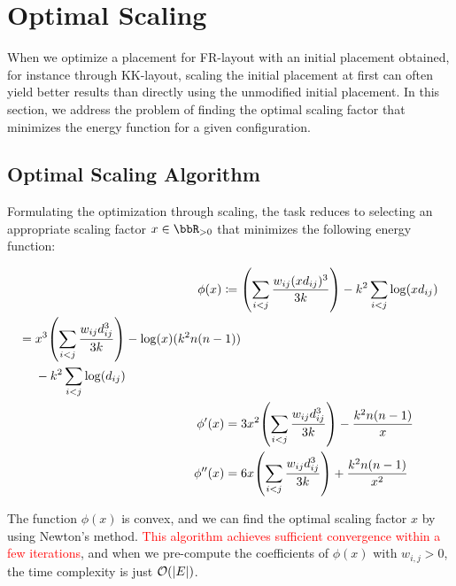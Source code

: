 \documentclass[dvipdfmx,journal]{IEEEtran}
\newcommand{\red}[1]{\textcolor{red}{#1}}
\newcommand{\defeq}{\coloneqq}
\begin{document}

\appendices

\section{Optimal Scaling}\label{sec:scaling}

When we optimize a placement for FR-layout with an initial placement obtained, for instance through KK-layout, scaling the initial placement at first can often yield better results than directly using the unmodified initial placement.
In this section, we address the problem of finding the optimal scaling factor that minimizes the energy function for a given configuration.

\subsection{Optimal Scaling Algorithm}\label{ssec:scalingAlgorithm}

Formulating the optimization through scaling, the task reduces to selecting an appropriate scaling factor $x \in \bbR_{> 0}$ that minimizes the following energy function:

\begin{align*}
  \phi(x) \defeq {} & \qty(\sum_{i < j} \frac{w_{ij} (xd_{ij})^3}{3k}) - k^2 \sum_{i < j} \log(x d_{ij})                                     \\
  \begin{split}
    = {} & x^3 \qty(\sum_{i < j} \frac{w_{ij} d_{ij}^3}{3k}) - \log(x)(k^2 n(n-1)) \\
         & - k^2 \sum_{i < j} \log(d_{ij})
  \end{split} \\
  \phi'(x) = {}     & 3x^2 \qty(\sum_{i < j} \frac{w_{ij} d_{ij}^3}{3k}) - \frac{k^2 n(n-1)}{x}                                              \\
  \phi''(x) = {}    & 6x \qty(\sum_{i < j} \frac{w_{ij} d_{ij}^3}{3k}) + \frac{k^2 n(n-1)}{x^2}
\end{align*}

The function $\phi(x)$ is convex, and we can find the optimal scaling factor $x$ by using Newton's method.
\red{This algorithm achieves sufficient convergence within a few iterations}, and when we pre-compute the coefficients of $\phi(x)$ with $w_{i,j} > 0$, the time complexity is just $\order{\abs{E}}$.
\end{document}
